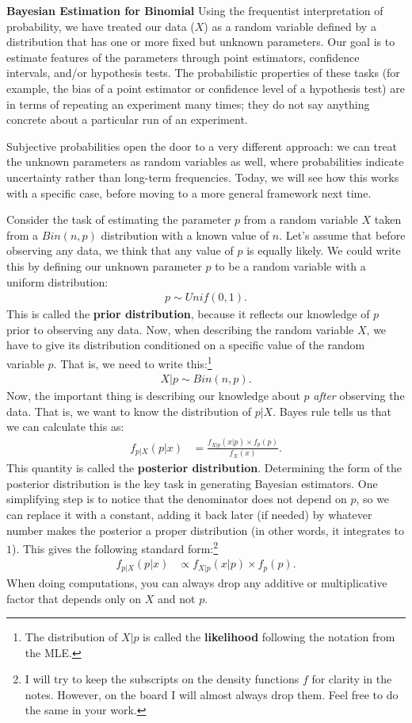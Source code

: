 \documentclass{tufte-handout}
\begin{document}
\noindent
\textbf{Bayesian Estimation for Binomial}
Using the frequentist interpretation of probability, we have treated
our data ($X$) as a random variable defined by a distribution that has
one or more fixed but unknown parameters. Our goal is to estimate
features of the parameters through point estimators, confidence intervals,
and/or hypothesis tests. The probabilistic properties of these tasks
(for example, the bias of a point estimator or confidence level of a
hypothesis test) are in terms of repeating an experiment many times;
they do not say anything concrete about a particular run of an experiment.

Subjective probabilities open the door to a very different approach:
we can treat the unknown parameters as random variables as well, where
probabilities indicate uncertainty rather than long-term frequencies.
Today, we will see how this works with a specific case, before moving
to a more general framework next time.

Consider the task of estimating the parameter $p$ from a random variable
$X$ taken from a $Bin(n, p)$ distribution with a known value of $n$.
Let's assume that before observing any data, we think that any value
of $p$ is equally likely. We could write this by defining our unknown
parameter $p$ to be a random variable with a uniform distribution:
\begin{align*}
p \sim Unif(0, 1).
\end{align*}
This is called the \textbf{prior distribution}, because it reflects
our knowledge of $p$ prior to observing any data.
Now, when describing the random variable $X$, we have to give its
distribution conditioned on a specific value of the random variable $p$.
That is, we need to write this:\footnote{
  The distribution of $X|p$ is called the \textbf{likelihood}
  following the notation from the MLE.
}
\begin{align*}
X|p \sim Bin(n, p).
\end{align*}
Now, the important thing is describing our knowledge about $p$ \textit{after}
observing the data. That is, we want to know the distribution of $p | X$.
Bayes rule tells us that we can calculate this as:
\begin{align*}
f_{p|X}(p|x) &= \frac{f_{X|p}(x|p) \times f_{p}(p)}{f_{X}(x)}.
\end{align*}
This quantity is called the \textbf{posterior distribution}. Determining
the form of the posterior distribution is the key task in generating
Bayesian estimators. One simplifying step is to notice that the denominator
does not depend on $p$, so we can replace it with a constant, adding it
back later (if needed) by whatever number makes the posterior a proper
distribution (in other words, it integrates to $1$). This gives the following
standard form:\footnote{
  I will try to keep the subscripts on the density functions $f$
  for clarity in the notes. However, on the board I will almost always drop
  them. Feel free to do the same in your work.
}
\begin{align*}
f_{p|X}(p|x) &\propto f_{X|p}(x|p) \times f_{p}(p).
\end{align*}
When doing computations, you can always drop any additive or multiplicative
factor that depends only on $X$ and not $p$.
\end{document}
